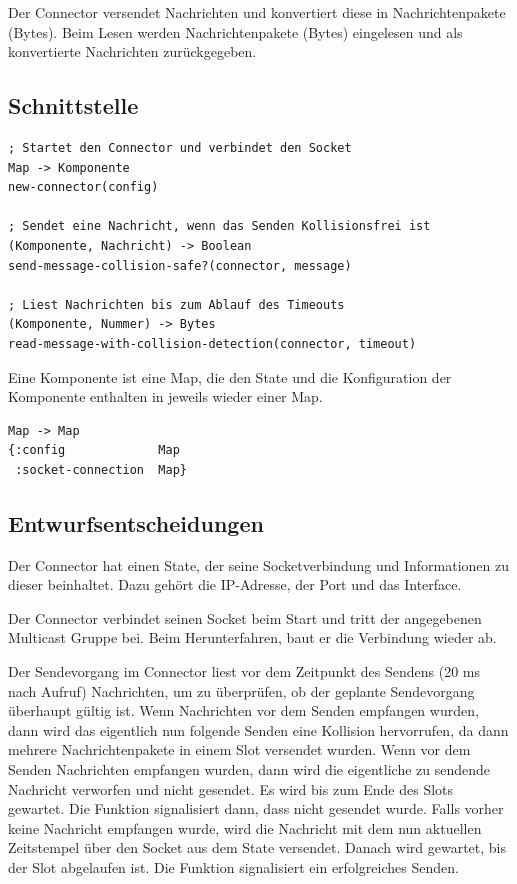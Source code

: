 \documentclass[draft=false
              ,paper=a4
              ,twoside=false
              ,fontsize=11pt
              ,headsepline
              ,BCOR10mm
              ,DIV11
              ]{scrbook}
\begin{document}
Der Connector versendet Nachrichten und konvertiert diese in Nachrichtenpakete (Bytes). Beim Lesen werden Nachrichtenpakete (Bytes) eingelesen und als konvertierte Nachrichten zurückgegeben.

\subsection{Schnittstelle}
\begin{lstlisting}
; Startet den Connector und verbindet den Socket
Map -> Komponente
new-connector(config)

; Sendet eine Nachricht, wenn das Senden Kollisionsfrei ist
(Komponente, Nachricht) -> Boolean
send-message-collision-safe?(connector, message)

; Liest Nachrichten bis zum Ablauf des Timeouts
(Komponente, Nummer) -> Bytes
read-message-with-collision-detection(connector, timeout) 
\end{lstlisting}

Eine Komponente ist eine Map, die den State und die Konfiguration der Komponente enthalten in jeweils wieder einer Map.
\begin{lstlisting}
Map -> Map
{:config             Map
 :socket-connection  Map}
\end{lstlisting}

\subsection{Entwurfsentscheidungen}
Der Connector hat einen State, der seine Socketverbindung und Informationen zu dieser beinhaltet. Dazu gehört die IP-Adresse, der Port und das Interface.

Der Connector verbindet seinen Socket beim Start und tritt der angegebenen Multicast Gruppe bei. Beim Herunterfahren, baut er die Verbindung wieder ab.

Der Sendevorgang im Connector liest vor dem Zeitpunkt des Sendens (20 ms nach Aufruf) Nachrichten, um zu überprüfen, ob der geplante Sendevorgang überhaupt gültig ist. Wenn Nachrichten vor dem Senden empfangen wurden, dann wird das eigentlich nun folgende Senden eine Kollision hervorrufen, da dann mehrere Nachrichtenpakete in einem Slot versendet wurden.
Wenn vor dem Senden Nachrichten empfangen wurden, dann wird die eigentliche zu sendende Nachricht verworfen und nicht gesendet. Es wird bis zum Ende des Slots gewartet. Die Funktion signalisiert dann, dass nicht gesendet wurde.
Falls vorher keine Nachricht empfangen wurde, wird die Nachricht mit dem nun aktuellen Zeitstempel über den Socket aus dem State versendet. Danach wird gewartet, bis der Slot abgelaufen ist. Die Funktion signalisiert ein erfolgreiches Senden.
\end{document}
